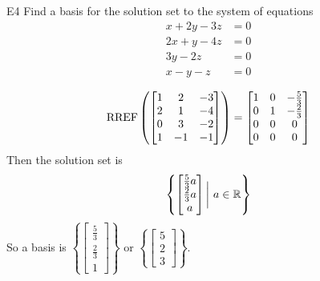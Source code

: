 \documentclass{sbgLAexam}
\begin{document}
\begin{problem}{E4}
Find a basis for the solution set to the system of equations
\begin{align*}
x+2y-3z &= 0 \\
2x+y-4z &= 0 \\
3y -2z & = 0 \\
x -y -z &= 0
\end{align*}
\end{problem}
\begin{solution}
$$\operatorname{RREF} \left(\begin{bmatrix} 1 & 2 & -3 \\ 2 & 1 & -4 \\ 0 & 3 & -2 \\ 1 & -1 & -1 \end{bmatrix} \right) = \begin{bmatrix} 1 & 0 & -\frac{5}{3} \\ 0 & 1 & -\frac{2}{3} \\ 0 & 0 & 0 \\ 0 & 0 & 0 \end{bmatrix}$$
Then the solution set is
$$\left\{ \begin{bmatrix} \frac{5}{3}a \\ \frac{2}{3}a \\ a \end{bmatrix} \bigg|\ a \in \mathbb{R} \right\}$$
So a basis is $\left\{ \begin{bmatrix} \frac{5}{3} \\ \frac{2}{3} \\ 1 \end{bmatrix} \right\}$ or $\left\{ \begin{bmatrix} 5 \\  2 \\ 3 \end{bmatrix} \right\}$.
\end{solution}
\end{document}
